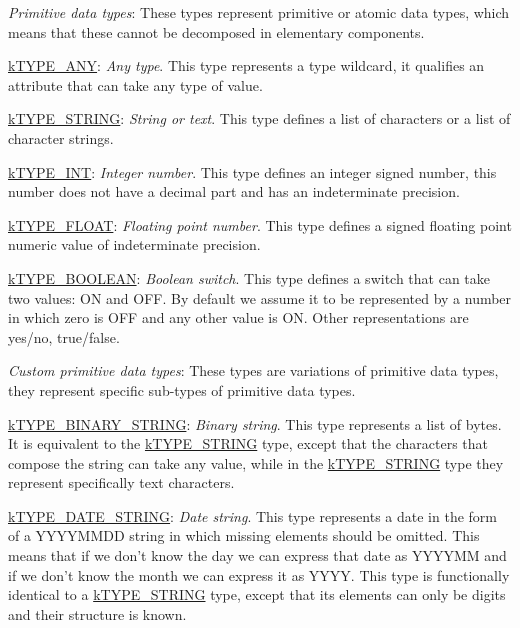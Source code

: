 \begin{DoxyItemize}
\item {\itshape Primitive data types}\-: These types represent primitive or atomic data types, which means that these cannot be decomposed in elementary components. 
\begin{DoxyItemize}
\item {\ttfamily \hyperlink{}{k\-T\-Y\-P\-E\-\_\-\-A\-N\-Y}}\-: {\itshape Any type}. This type represents a type wildcard, it qualifies an attribute that can take any type of value. 
\item {\ttfamily \hyperlink{}{k\-T\-Y\-P\-E\-\_\-\-S\-T\-R\-I\-N\-G}}\-: {\itshape String or text}. This type defines a list of characters or a list of character strings. 
\item {\ttfamily \hyperlink{}{k\-T\-Y\-P\-E\-\_\-\-I\-N\-T}}\-: {\itshape Integer number}. This type defines an integer signed number, this number does not have a decimal part and has an indeterminate precision. 
\item {\ttfamily \hyperlink{}{k\-T\-Y\-P\-E\-\_\-\-F\-L\-O\-A\-T}}\-: {\itshape Floating point number}. This type defines a signed floating point numeric value of indeterminate precision. 
\item {\ttfamily \hyperlink{}{k\-T\-Y\-P\-E\-\_\-\-B\-O\-O\-L\-E\-A\-N}}\-: {\itshape Boolean switch}. This type defines a switch that can take two values\-: {\ttfamily O\-N} and {\ttfamily O\-F\-F}. By default we assume it to be represented by a number in which zero is {\ttfamily O\-F\-F} and any other value is {\ttfamily O\-N}. Other representations are {\ttfamily yes}/{\ttfamily no}, {\ttfamily true}/{\ttfamily false}. 
\end{DoxyItemize}
\item {\itshape Custom primitive data types}\-: These types are variations of primitive data types, they represent specific sub-\/types of primitive data types. 
\begin{DoxyItemize}
\item {\ttfamily \hyperlink{}{k\-T\-Y\-P\-E\-\_\-\-B\-I\-N\-A\-R\-Y\-\_\-\-S\-T\-R\-I\-N\-G}}\-: {\itshape Binary string}. This type represents a list of bytes. It is equivalent to the \hyperlink{}{k\-T\-Y\-P\-E\-\_\-\-S\-T\-R\-I\-N\-G} type, except that the characters that compose the string can take any value, while in the \hyperlink{}{k\-T\-Y\-P\-E\-\_\-\-S\-T\-R\-I\-N\-G} type they represent specifically text characters. 
\item {\ttfamily \hyperlink{}{k\-T\-Y\-P\-E\-\_\-\-D\-A\-T\-E\-\_\-\-S\-T\-R\-I\-N\-G}}\-: {\itshape Date string}. This type represents a date in the form of a {\ttfamily Y\-Y\-Y\-Y\-M\-M\-D\-D} string in which missing elements should be omitted. This means that if we don't know the day we can express that date as {\ttfamily Y\-Y\-Y\-Y\-M\-M} and if we don't know the month we can express it as {\ttfamily Y\-Y\-Y\-Y}. This type is functionally identical to a \hyperlink{}{k\-T\-Y\-P\-E\-\_\-\-S\-T\-R\-I\-N\-G} type, except that its elements can only be digits and their structure is known. 

\end{DoxyItemize}
\end{DoxyItemize}
